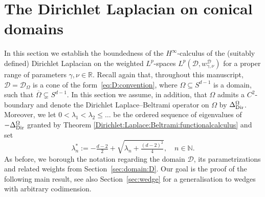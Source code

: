 \documentclass[12pt,a4paper, reqno]{amsart}
\theoremstyle{plain}
\theoremstyle{definition}
\theoremstyle{remark}
\numberwithin{equation}{section}
\newcommand{\1}{\mathbbm{1}}
\newcommand{\R}{\ensuremath{\mathbb{R}}}
\newcommand{\N}{\ensuremath{\mathbb{N}}}
\newcommand{\calD}{\ensuremath{\mathcal{D}}}
\newcommand{\Dir}{\textup{Dir}}
\begin{document}
\section{The Dirichlet Laplacian on conical domains}\label{sec:Dirichlet-Laplacian}
In this section we establish the boundedness of the $H^\infty$-calculus of the (suitably defined)  Dirichlet Laplacian on the weighted $L^p$-spaces $L^p(\calD,w_{\gamma,\nu}^\calD)$ for a proper range of parameters $\gamma,\nu\in\R$. 
Recall again that, throughout this manuscript, $\calD=\calD_\Omega$ is a cone of the form~\eqref{eq:D:convention}, where $\Omega\subseteq S^{d-1}$ is a domain, such that $\overline{\Omega}\subsetneq S^{d-1}$. In this section we assume, in addition, that $\Omega$ admits a $C^2$-boundary and denote the  Dirichlet Laplace--Beltrami operator on $\Omega$ by $\Delta_\Dir^\Omega$. Moreover, we let $0<\lambda_1<\lambda_2\le \ldots$ be the ordered sequence of eigenvalues of $-\Delta_\Dir^{\Omega}$ granted by Theorem \ref{Dirichlet:Laplace:Beltrami:functionalcalculus} and set   
\[\lambda^*_n:=-\tfrac{d-2}{2}+\sqrt{\lambda_n+\tfrac{(d-2)^2}{4}}, \quad n\in\N.\]
As before, we borough the notation regarding the domain $\calD$, its parametrizations and related weights from Section~\ref{sec:domain:D}.
Our goal is the proof of the following main result, see also Section~\ref{sec:wedge} for a generalisation to wedges with arbitrary codimension.
\end{document}
